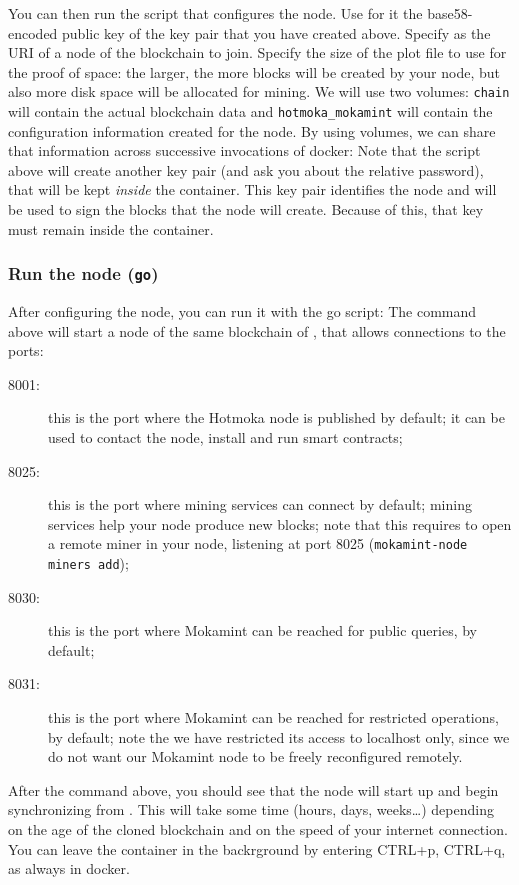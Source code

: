 You can then run the script that configures the node. Use for it the base58-encoded public key
of the key pair that you have created above. Specify \serverMokamintPublic{}
as the URI of a node of the blockchain to join.
Specify the size of the plot file to use for the proof of space:
the larger, the more blocks will be created by your node, but also more disk space
will be allocated for mining. We will use two volumes: \texttt{chain} will contain
the actual blockchain data and \texttt{hotmoka\_mokamint} will contain the configuration
information created for the node. By using volumes, we can share that information
across successive invocations of docker:
%
%
Note that the script above will create another key pair (and ask you about the relative password),
that will be kept \emph{inside} the container. This key pair identifies the node
and will be used to sign the blocks that the node will create. Because of this, that key
must remain inside the container.

\subsubsection{Run the node (\texttt{go})}\label{subsubsec:mokamint_go}

After configuring the node, you can run it with the go script:
%
%
The command above will start a node of the same blockchain of \serverMokamint{},
that allows connections to the ports:
%
\begin{description}
\item[8001:] this is the port where the Hotmoka node is published by default;
	it can be used to contact the node, install and run smart contracts;
\item[8025:] this is the port where mining services can connect by default;
	mining services help your node produce new blocks; note that this requires to open
	a remote miner in your node, listening at port 8025 (\texttt{mokamint-node miners add});
\item[8030:] this is the port where Mokamint can be reached for public queries, by default;
\item[8031:] this is the port where Mokamint can be reached for restricted operations, by default;
	note the we have restricted its access to localhost only,
	since we do not want our Mokamint node to be freely reconfigured remotely.
\end{description}
%
After the command above, you should see that the node will start up and begin synchronizing
from \serverMokamintPublic{}. This will take some time (hours, days, weeks\ldots) depending
on the age of the cloned blockchain and on the speed of your internet connection.
You can leave the container in the backrground by entering CTRL+p, CTRL+q, as always in docker.

